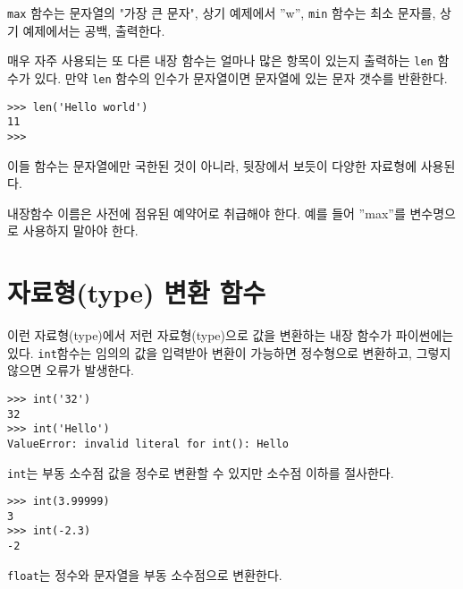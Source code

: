 {\tt max} 함수는 문자열의 "가장 큰 문자", 상기 예제에서 ''w'', 
{\tt min} 함수는 최소 문자를, 상기 예제에서는 공백, 출력한다.

매우 자주 사용되는 또 다른 내장 함수는 얼마나 많은 항목이 있는지 출력하는 {\tt len} 함수가 있다.
만약 {\tt len} 함수의 인수가 문자열이면 문자열에 있는 문자 갯수를 반환한다.

\beforeverb
\begin{verbatim}
>>> len('Hello world')
11
>>>
\end{verbatim}
\afterverb
%

이들 함수는 문자열에만 국한된 것이 아니라, 뒷장에서 보듯이 다양한 자료형에 사용된다.

내장함수 이름은 사전에 점유된 예약어로 취급해야 한다. 예를 들어 ''max''를 변수명으로 사용하지 말아야 한다.


\section{자료형(type) 변환 함수}



이런 자료형(type)에서 저런 자료형(type)으로 값을 변환하는 내장 함수가 파이썬에는 있다.
{\tt int}함수는 임의의 값을 입력받아 변환이 가능하면 정수형으로 변환하고, 그렇지 않으면 오류가 발생한다.


\beforeverb
\begin{verbatim}
>>> int('32')
32
>>> int('Hello')
ValueError: invalid literal for int(): Hello
\end{verbatim}
\afterverb
%

{\tt int}는 부동 소수점 값을 정수로 변환할 수 있지만 소수점 이하를 절사한다.

\beforeverb
\begin{verbatim}
>>> int(3.99999)
3
>>> int(-2.3)
-2
\end{verbatim}
\afterverb
%

{\tt float}는 정수와 문자열을 부동 소수점으로 변환한다.


